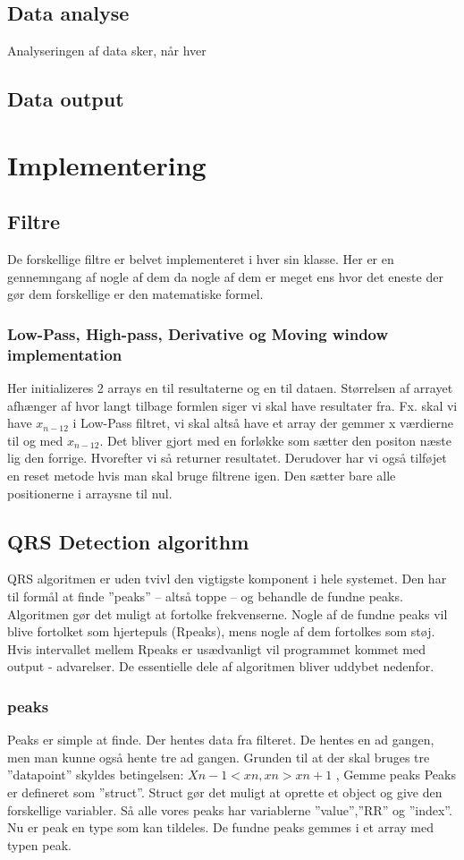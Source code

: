 \documentclass[a4paper,12pt]{article}
\begin{document}
\subsection{Data analyse}
Analyseringen af data sker, når hver 
\subsection{Data output}
\section{Implementering}
\subsection{Filtre}
De forskellige filtre er belvet implementeret i hver sin klasse. Her er en gennemngang af nogle af dem da nogle af dem er meget ens hvor det eneste der gør dem forskellige er den matematiske formel.

\subsubsection{Low-Pass, High-pass, Derivative og Moving window implementation}
Her initializeres 2 arrays en til resultaterne og en til dataen. Størrelsen af arrayet afhænger af hvor langt tilbage formlen siger vi skal have resultater fra. Fx. skal vi have $x_{n-12}$ i Low-Pass filtret, vi skal altså have et array der gemmer x værdierne til og med $x_{n-12}$. Det bliver gjort med en forløkke som sætter den positon næste lig den forrige.
Hvorefter vi så returner resultatet. Derudover har vi også tilføjet en reset metode hvis man skal bruge filtrene igen. Den sætter bare alle positionerne i arraysne til nul.
\subsection{QRS Detection algorithm}


QRS algoritmen er uden tvivl den vigtigste komponent i hele systemet. Den har til formål at finde ”peaks” – altså toppe – og behandle de fundne peaks. Algoritmen gør det muligt at fortolke frekvenserne. Nogle af de fundne peaks vil blive fortolket som hjertepuls (Rpeaks), mens nogle af dem fortolkes som støj. Hvis intervallet mellem Rpeaks er usædvanligt vil programmet kommet med output - advarelser. De essentielle dele af algoritmen bliver uddybet nedenfor.
\subsubsection{peaks}
Peaks er simple at finde. Der hentes data fra filteret. De hentes en ad gangen, men man kunne også hente tre ad gangen. Grunden til at der skal bruges tre ”datapoint” skyldes betingelsen:
$Xn-1 < xn, xn > xn+1$  ,  
Gemme peaks
Peaks er defineret som ”struct”. Struct gør det muligt at oprette et object og give den forskellige variabler. Så alle vores peaks har variablerne ”value”,”RR” og ”index”.
Nu er peak en type som kan tildeles. De fundne peaks gemmes i et array med typen peak. 
\end{document}
